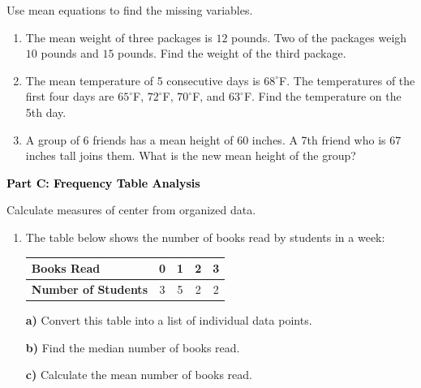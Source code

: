 \documentclass[12pt, letterpaper, fleqn]{article}
\begin{document}
\vspace{3mm}

\noindent
Use mean equations to find the missing variables.

\vspace{5mm}

\begin{enumerate}[itemsep=2.5cm, leftmargin=0.6cm]
\item The mean weight of three packages is $12$ pounds. Two of the packages weigh $10$ pounds and $15$ pounds. Find the weight of the third package.
\vspace{1.5cm}

\item The mean temperature of 5 consecutive days is $68^\circ$F. The temperatures of the first four days are $65^\circ$F, $72^\circ$F, $70^\circ$F, and $63^\circ$F. Find the temperature on the 5th day.
\vspace{1.5cm}

\item A group of 6 friends has a mean height of $60$ inches. A 7th friend who is $67$ inches tall joins them. What is the new mean height of the group?
\end{enumerate}

\newpage

\begin{tcolorbox}[colback=black!10]
    \large\textcolor{black}{\textbf{Part C: Frequency Table Analysis}}
\end{tcolorbox}

\vspace{3mm}

\noindent
Calculate measures of center from organized data.

\vspace{5mm}

\begin{enumerate}[itemsep=2.5cm, leftmargin=0.6cm]
\item The table below shows the number of books read by students in a week: \\
\begin{center}
\begin{tabular}{|l|c|c|c|c|}
\hline
\textbf{Books Read} & 0 & 1 & 2 & 3 \\ \hline
\textbf{Number of Students} & 3 & 5 & 2 & 2 \\
\hline
\end{tabular}
\end{center}
\vspace{0.5cm}
\textbf{a)} Convert this table into a list of individual data points. \\
\vspace{3cm}

\textbf{b)} Find the median number of books read. \\
\vspace{3cm}

\textbf{c)} Calculate the mean number of books read. \\

\end{enumerate}
\end{document}
